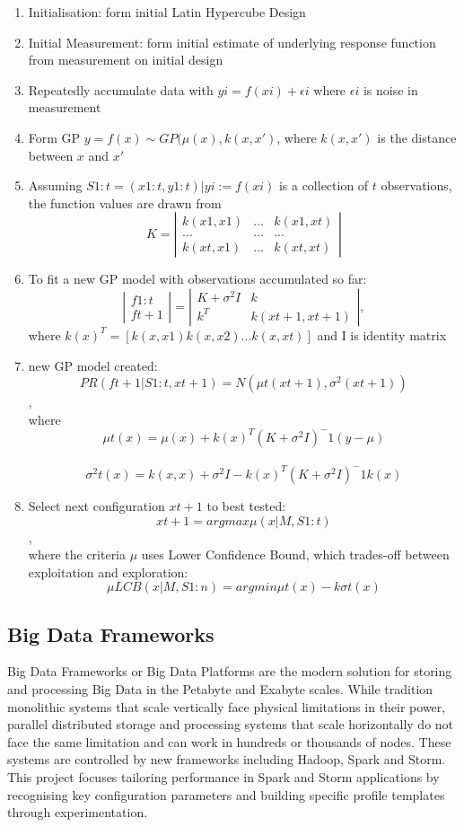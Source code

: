 \begin{enumerate}
\item Initialisation: form initial Latin Hypercube Design
\item Initial Measurement: form initial estimate of underlying response function from measurement on initial design
\item Repeatedly accumulate data with $yi = f(xi) + \epsilon i$ where $\epsilon i$ is noise in measurement
\item Form GP $y = f(x) \sim GP(\mu(x), k(x,x')$, where $k(x,x')$ is the distance between $x$ and $x'$
\item Assuming $S1:t = {(x1:t, y1:t)|yi := f(xi)}$ is a collection of $t$ observations, the function values are drawn from 
\[ K = \left| \begin{array}{ccc}
k(x1,x1) & ... & k(x1,xt) \\
... & ... & ... \\
k(xt,x1) & ... & k(xt,xt) \end{array} \right|\] 
\item To fit a new GP model with observations accumulated so far:
\[ \left| \begin{array}{c}f1:t \\ ft+1 \end{array} \right| 
= \left| \begin{array}{cc}
K + \sigma ^2 I & k\\
k^T & k(xt+1,xt+1)\end{array} \right|,\]
where $k(x)^T = [k(x,x1) k(x,x2) ... k(x,xt)] $ and I is identity matrix
\item new GP model created:
$$PR(ft+1|S1:t, xt+1) = N(\mu t(xt+1), \sigma ^2(xt+1))$$,\\
where $$\mu t(x) = \mu (x) + k(x)^T(K + \sigma ^2 I)^-1 (y-\mu)$$\\
$$\sigma ^2 t(x) = k(x,x) + \sigma ^2 I - k(x)^T(K + \sigma ^2 I)^-1 k(x)$$
\item Select next configuration $xt+1$ to best tested: 
$$xt+1 = argmax \mu (x|M,S1:t)$$,\\
where the criteria $\mu$ uses Lower Confidence Bound, which trades-off between exploitation and exploration:
$$\mu LCB(x|M, S1:n) = argmin\mu t(x) - k \sigma t(x)$$

\end{enumerate}

\newpage
\subsection{Big Data Frameworks}
Big Data Frameworks or Big Data Platforms are the modern solution for storing and processing Big Data in the Petabyte and Exabyte scales. While tradition monolithic systems that scale vertically face physical limitations in their power, parallel distributed storage and processing systems that scale horizontally do not face the same limitation and can work in hundreds or thousands of nodes. These systems are controlled by new frameworks including Hadoop, Spark and Storm. This project focuses tailoring performance in Spark and Storm applications by recognising key configuration parameters and building specific profile templates through experimentation.

